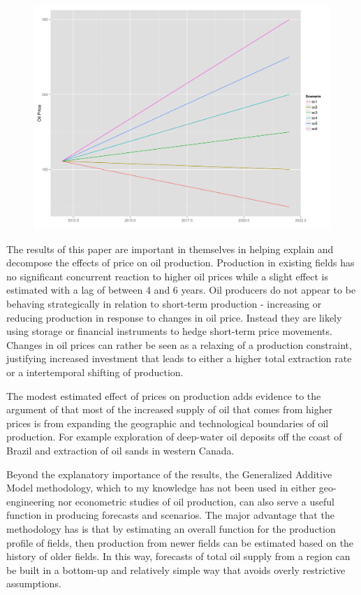 \documentclass[12pt]{article}
\begin{document}
\begin{figure}
	\includegraphics[width=1\textwidth]{price_scenario.png}
	\caption{}
	\label{price_scenario}
\end{figure}

The results of this paper are important in themselves in helping explain and decompose the effects of price on oil production.  Production in existing fields has no significant concurrent reaction to higher oil prices while a slight effect is estimated  with a lag of between 4 and 6 years.  Oil producers do not appear to be behaving strategically in relation to short-term production - increasing or reducing production in response to changes in oil price.  Instead they are likely using storage or financial instruments to hedge short-term price movements. Changes in oil prices can rather be seen as a relaxing of a production constraint, justifying increased investment that leads to either a higher total extraction rate or a intertemporal shifting of production. 

The modest estimated effect of prices on production adds evidence to the argument of \citet{hamilton_oil_2012} that most of the increased supply of oil that comes from higher prices is from expanding the geographic and technological boundaries of oil production.  For example exploration of deep-water oil deposits off the coast of Brazil and extraction of oil sands in western Canada.  

Beyond the explanatory importance of the results, the Generalized Additive Model methodology, which to my knowledge has not been used in either geo-engineering nor econometric studies of oil production, can also serve a useful function in producing forecasts and scenarios.  The major advantage that the methodology has is that by estimating an overall function for the production profile of fields, then production from newer fields can be estimated based on the history of older fields.  In this way, forecasts of total oil supply from a region can be built in a bottom-up and relatively simple way that avoids overly restrictive assumptions. 
\end{document}
